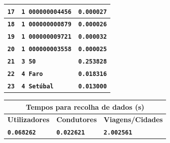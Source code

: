 \documentclass[12pt,a4paper]{report}
\begin{document}
\begin{tabularx}{\textwidth} { 
  | >{\centering\arraybackslash}X 
  | >{\centering\arraybackslash}X 
  | >{\centering\arraybackslash}X | }
 \hline
 \texttt{\textbf{17}} & \texttt{\textbf{1 000000004456}} & \texttt{\textbf{0.000027}}  \\
 \hline
 \texttt{\textbf{18}} & \texttt{\textbf{1 000000000879}} & \texttt{\textbf{0.000026}}  \\
 \hline
 \texttt{\textbf{19}} & \texttt{\textbf{1 000000009721}} & \texttt{\textbf{0.000032}}  \\
 \hline
 \texttt{\textbf{20}} & \texttt{\textbf{1 000000003558}} & \texttt{\textbf{0.000025}}  \\
 \hline
 \texttt{\textbf{21}} & \texttt{\textbf{3 50}} & \texttt{\textbf{0.253828}}  \\
 \hline
 \texttt{\textbf{22}} & \texttt{\textbf{4 Faro}} & \texttt{\textbf{0.018316}}  \\
 \hline
 \texttt{\textbf{23}} & \texttt{\textbf{4 Setúbal}} & \texttt{\textbf{0.013000}}  \\
 \hline
\end{tabularx}

\vspace{15pt}
\begin{center}
\begin{tabular}{ |p{4.73cm}|p{4.73cm}|p{4.73cm}|  }
 \hline
 \multicolumn{3}{|c|}{\textbf{Tempos para recolha de dados (s)}} \\
 \hline
 \centering\textbf{Utilizadores} & \hfil \textbf{Condutores} & \hfil \textbf{Viagens/Cidades} \\
 \hline
 \centering\textbf{\texttt{0.068262}} & \hfil \texttt{\textbf{0.022621}} & \hfil \texttt{\textbf{2.002561}}\\
 \hline
\end{tabular}
\end{center}
\end{document}
